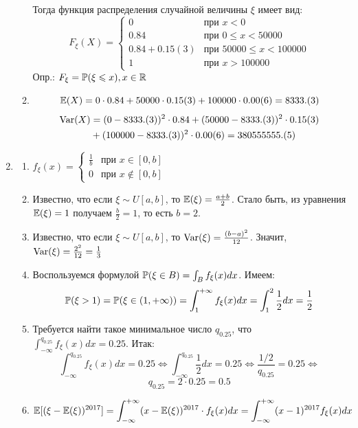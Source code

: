 \begin{enumerate}
\begin{enumerate}
Тогда функция распределения случайной величины $\xi$ имеет вид:
\[
F_{\xi} (X) =
\begin{cases}
0 & \text{при } x<0 \\
0.84 & \text{при } 0 \leq x < 50000 \\
0.84 + 0.15(3) & \text{при } 50000
\leq x < 100000 \\
1 & \text{при } x > 100000
\end{cases}
\]
Опр.: $F_{\xi} = \P (\xi \leq x ), x \in \mathbb{R}$
\item \[
\E (X) = 0 \cdot 0.84 + 50000 \cdot 0.15(3) + 100000 \cdot 0.00(6) = 8333.(3)
\]
\begin{align*}
\Var(X) &= (0 - 8333.(3))^2 \cdot 0.84 + (50000-8333.(3))^2 \cdot 0.15(3) \\
&+ (100000 - 8333.(3))^2 \cdot 0.00(6) = 380555555.(5)
\end{align*}
\end{enumerate}
\item
\begin{enumerate}
\item $ f_{\xi} (x)=
\begin{cases}
\frac{1}{b} & \text{при } x \in [0, b] \\
0 & \text{при } x \notin [0, b]
\end{cases}
$
\item  Известно, что если $\xi \sim U[a, b]$, то $\E (\xi) = \frac{a+b}{2}$. Стало быть, из уравнения $\E (\xi) = 1$ получаем $\frac{b}{2} = 1$,  то есть $b=2$.
\item Известно, что если $\xi \sim U[a, b]$, то $\Var (\xi) = \frac{(b-a)^2}{12}$. Значит, $\Var (\xi) = \frac{2^2}{12} = \frac{1}{3}$
\item Воспользуемся формулой $\P (\xi \in B ) = \int_B f_{\xi} (x) dx$. Имеем:
\[
\P (\xi > 1 ) = \P (\xi \in (1, + \infty) ) = \int_{1}^{+ \infty} f_{\xi} (x) dx = \int_{1}^{2} \frac{1}{2} dx = \frac{1}{2}
\]
\item Требуется найти такое минимальное число $q_{0.25}$, что $\int_{-\infty}^{q_{0.25}} f_{\xi} (x) dx = 0.25$. Итак:
\[
\int_{-\infty}^{q_{0.25}} f_{\xi} (x) dx = 0.25 \Leftrightarrow \int_{-\infty}^{q_{0.25}} \frac{1}{2} dx = 0.25 \Leftrightarrow \frac{1/2}{q_{0.25}} = 0.25 \Leftrightarrow
\]
\[
q_{0.25} = 2 \cdot 0.25 = 0.5
\]
\item
\begin{align*}
\E [ (\xi - \E(\xi))^{2017} ] &= \int_{-\infty}^{+\infty} (x- \E(\xi) )^{2017} \cdot f_{\xi} (x) dx = \int_{-\infty}^{+\infty} (x-1)^{2017} f_{\xi} (x) dx \\

\end{align*}
\end{enumerate}
\end{enumerate}
